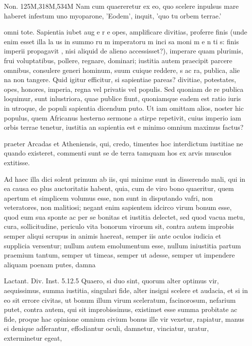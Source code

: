  Non. 125M,318M,534M Nam cum quaereretur ex eo, quo scelere inpulsus mare haberet infestum uno myoparone, 'Eodem', inquit, 'quo tu orbem terrae.'

 omni tote. Sapientia iubet aug e r e opes, amplificare divitias, proferre finis (unde enim esset illa la us in summo ru m imperatoru m inci sa moni m e n ti s: finis imperii propagavit , nisi aliquid de alieno accessisset?), imperare quam plurimis, frui voluptatibus, pollere, regnare, dominari; iustitia autem praecipit parcere omnibus, consulere generi hominum, suum cuique reddere, s ac ra, publica, alie na non tangere. Quid igitur efficitur, si sapientiae pareas? divitiae, potestates, opes, honores, imperia, regna vel privatis vel populis. Sed quoniam de re publica loquimur, sunt inlustriora, quae publice fiunt, quoniamque eadem est ratio iuris in utroque, de populi sapientia dicendum puto. Ut iam omittam alios, noster hic populus, quem Africanus hesterno sermone a stirpe repetivit, cuius imperio iam orbis terrae tenetur, iustitia an sapientia est e minimo omnium maximus factus?

 praeter Arcadas et Atheniensis, qui, credo, timentes hoc interdictum iustitiae ne quando existeret, commenti sunt se de terra tamquam hos ex arvis musculos extitisse.

 Ad haec illa dici solent primum ab iis, qui minime sunt in disserendo mali, qui in ea causa eo plus auctoritatis habent, quia, cum de viro bono quaeritur, quem apertum et simplicem volumus esse, non sunt in disputando vafri, non veteratores, non malitiosi; negant enim sapientem idcirco virum bonum esse, quod eum sua sponte ac per se bonitas et iustitia delectet, sed quod vacua metu, cura, sollicitudine, periculo vita bonorum virorum sit, contra autem improbis semper aliqui scrupus in animis haereat, semper iis ante oculos iudicia et supplicia versentur; nullum autem emolumentum esse, nullum iniustitia partum praemium tantum, semper ut timeas, semper ut adesse, semper ut impendere aliquam poenam putes, damna

 Lactant. Div. Inst. 5.12.5 Quaero, si duo sint, quorum alter optimus vir, aequissimus, summa iustitia, singulari fide, alter insigni scelere et audacia, et si in eo sit errore civitas, ut bonum illum virum sceleratum, facinorosum, nefarium putet, contra autem, qui sit improbissimus, existimet esse summa probitate ac fide, proque hac opinione omnium civium bonus ille vir vexetur, rapiatur, manus ei denique adferantur, effodiantur oculi, damnetur, vinciatur, uratur, exterminetur egeat,

